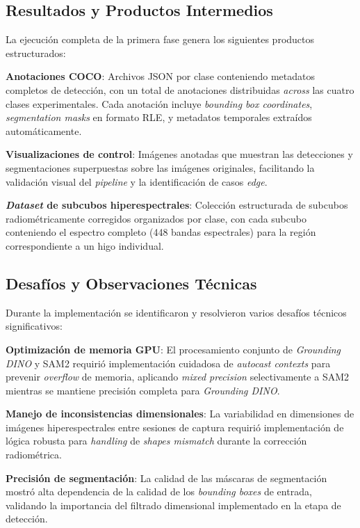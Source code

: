 \subsection{Resultados y Productos Intermedios}

La ejecución completa de la primera fase genera los siguientes productos estructurados:

\textbf{Anotaciones COCO}: Archivos JSON por clase conteniendo metadatos completos de detección, con un total de anotaciones distribuidas \emph{across} las cuatro clases experimentales. Cada anotación incluye \emph{bounding box coordinates}, \emph{segmentation masks} en formato RLE, y metadatos temporales extraídos automáticamente.


\textbf{Visualizaciones de control}: Imágenes anotadas que muestran las detecciones y segmentaciones superpuestas sobre las imágenes originales, facilitando la validación visual del \emph{pipeline} y la identificación de casos \emph{edge}.

\textbf{\emph{Dataset} de subcubos hiperespectrales}: Colección estructurada de subcubos radiométricamente corregidos organizados por clase, con cada subcubo conteniendo el espectro completo (448 bandas espectrales) para la región correspondiente a un higo individual.

\subsection{Desafíos y Observaciones Técnicas}

Durante la implementación se identificaron y resolvieron varios desafíos técnicos significativos:

\textbf{Optimización de memoria GPU}: El procesamiento conjunto de \emph{Grounding DINO} y SAM2 requirió implementación cuidadosa de \emph{autocast contexts} para prevenir \emph{overflow} de memoria, aplicando \emph{mixed precision} selectivamente a SAM2 mientras se mantiene precisión completa para \emph{Grounding DINO}.

\textbf{Manejo de inconsistencias dimensionales}: La variabilidad en dimensiones de imágenes hiperespectrales entre sesiones de captura requirió implementación de lógica robusta para \emph{handling} de \emph{shapes mismatch} durante la corrección radiométrica.

\textbf{Precisión de segmentación}: La calidad de las máscaras de segmentación mostró alta dependencia de la calidad de los \emph{bounding boxes} de entrada, validando la importancia del filtrado dimensional implementado en la etapa de detección.

